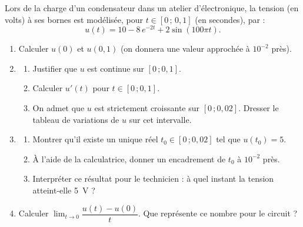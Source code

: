 \documentclass[11pt]{article}
\begin{document}
\begin{exercice}
Lors de la charge d'un condensateur dans un atelier d'électronique, la tension (en volts) à ses bornes est modélisée, pour $t\in[0\,;\,0{,}1]$ (en secondes), par :
\[u(t)=10-8\,e^{-2t}+2\sin(100\pi t).\]
\begin{enumerate}
\item Calculer $u(0)$ et $u(0{,}1)$ (on donnera une valeur approchée à $10^{-2}$ près).
\item \begin{enumerate}
\item Justifier que $u$ est continue sur $[0\,;0{,}1]$.
\item Calculer $u'(t)$ pour $t\in[0\,;0{,}1]$.
\item On admet que $u$ est strictement croissante sur $[0\,;0{,}02]$. Dresser le tableau de variations de $u$ sur cet intervalle.
\end{enumerate}
\item \begin{enumerate}
\item Montrer qu'il existe un unique réel $t_0\in[0\,;0{,}02]$ tel que $u(t_0)=5$.
\item À l'aide de la calculatrice, donner un encadrement de $t_0$ à $10^{-2}$ près.
\item Interpréter ce résultat pour le technicien : à quel instant la tension atteint-elle \SI{5}{V} ?
\end{enumerate}
\item Calculer $\displaystyle\lim_{t\to 0}\dfrac{u(t)-u(0)}{t}$. Que représente ce nombre pour le circuit ?
\end{enumerate}
\end{exercice}
\end{document}
